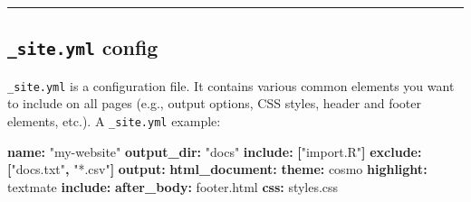 \documentclass[
  a4paper,
  twoside,
  openright]{book}
\newenvironment{Shaded}{\begin{snugshade}}{\end{snugshade}}
\newcommand{\AttributeTok}[1]{\textcolor[rgb]{0.13,0.29,0.53}{#1}}
\newcommand{\FunctionTok}[1]{\textcolor[rgb]{0.13,0.29,0.53}{\textbf{#1}}}
\newcommand{\KeywordTok}[1]{\textcolor[rgb]{0.13,0.29,0.53}{\textbf{#1}}}
\newcommand{\StringTok}[1]{\textcolor[rgb]{0.31,0.60,0.02}{#1}}
\theoremstyle{definition}
\theoremstyle{definition}
\theoremstyle{definition}
\theoremstyle{definition}
\theoremstyle{remark}
\begin{document}
\begin{center}\rule{0.5\linewidth}{0.5pt}\end{center}

\subsection*{\texorpdfstring{\texttt{\_site.yml} config}{\_site.yml config}}\label{site.yml-config}

\texttt{\_site.yml} is a configuration file. It contains various common elements you want to include on all pages (e.g., output options, CSS styles, header and footer elements, etc.).
A \texttt{\_site.yml} example:

\begin{Shaded}
\begin{Highlighting}[]
\FunctionTok{name}\KeywordTok{:}\AttributeTok{ }\StringTok{"my{-}website"}
\FunctionTok{output\_dir}\KeywordTok{:}\AttributeTok{ }\StringTok{"docs"}
\FunctionTok{include}\KeywordTok{:}\AttributeTok{ }\KeywordTok{[}\StringTok{"import.R"}\KeywordTok{]}
\FunctionTok{exclude}\KeywordTok{:}\AttributeTok{ }\KeywordTok{[}\StringTok{"docs.txt"}\KeywordTok{,}\AttributeTok{ }\StringTok{"*.csv"}\KeywordTok{]}
\FunctionTok{output}\KeywordTok{:}
\AttributeTok{  }\FunctionTok{html\_document}\KeywordTok{:}
\AttributeTok{    }\FunctionTok{theme}\KeywordTok{:}\AttributeTok{ cosmo}
\AttributeTok{    }\FunctionTok{highlight}\KeywordTok{:}\AttributeTok{ textmate}
\AttributeTok{    }\FunctionTok{include}\KeywordTok{:}
\AttributeTok{      }\FunctionTok{after\_body}\KeywordTok{:}\AttributeTok{ footer.html}
\AttributeTok{    }\FunctionTok{css}\KeywordTok{:}\AttributeTok{ styles.css}
\end{Highlighting}
\end{Shaded}
\end{document}

